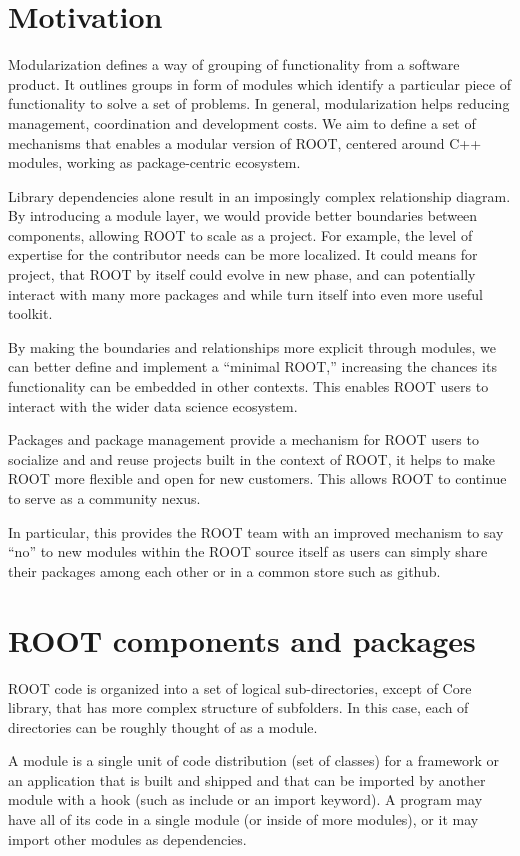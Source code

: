 \documentclass{webofc}
\begin{document}
\section{Motivation}

Modularization defines a way of grouping of functionality from a software product. It outlines groups in form of modules which identify a particular piece of functionality to solve a set of problems. In general, modularization helps reducing management, coordination and development costs.
We aim to define a set of mechanisms that enables a modular version of ROOT, centered around C++ modules, working as package-centric ecosystem.

Library dependencies alone result in an imposingly complex relationship diagram. By introducing a module layer, we would provide better boundaries between components, allowing ROOT to scale as a project. For example, the level of expertise for the contributor needs can be more localized. It could means for project, that ROOT by itself could evolve in new phase, and can potentially interact with many more packages and while turn itself into even more useful toolkit. 

By making the boundaries and relationships more explicit through modules, we can better define and implement a “minimal ROOT,” increasing the chances its functionality can be embedded in other contexts.  This enables ROOT users to interact with the wider data science ecosystem.

Packages and package management provide a mechanism for ROOT users to socialize and and reuse projects built in the context of ROOT, it helps to make ROOT more flexible and open for new customers.  This allows ROOT to continue to serve as a community nexus.

In particular, this provides the ROOT team with an improved mechanism to say “no” to new modules within the ROOT source itself as users can simply share their packages among each other or in a common store such as github.

\section{ROOT components and packages}

ROOT code is organized into a set of logical sub-directories, except of Core library, that has more complex structure of subfolders. In this case, each of directories can be roughly thought of as a module. 

A module is a single unit of code distribution (set of classes) for a framework or an application that is built and shipped and that can be imported by another module with a hook (such as  include or an import keyword). A program may have all of its code in a single module (or inside of more modules), or it may import other modules as dependencies.
\end{document}
